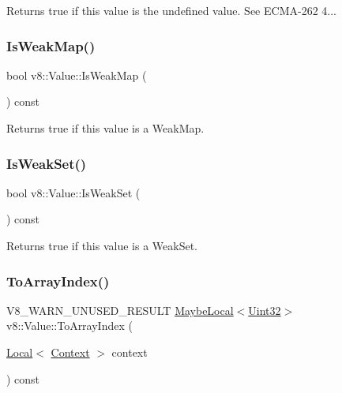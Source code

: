 Returns true if this value is the undefined value. See E\+C\+M\+A-\/262 4... \mbox{\label{classv8_1_1Value_a3be1c8f103d9aa9b31b3b1c56905337d}} 
\subsubsection{\texorpdfstring{Is\+Weak\+Map()}{IsWeakMap()}}
{\footnotesize\ttfamily bool v8\+::\+Value\+::\+Is\+Weak\+Map (\begin{DoxyParamCaption}{ }\end{DoxyParamCaption}) const}

Returns true if this value is a Weak\+Map. \mbox{\label{classv8_1_1Value_a66c2dbb0ed13325f0f9e6b38e5e1992c}} 
\subsubsection{\texorpdfstring{Is\+Weak\+Set()}{IsWeakSet()}}
{\footnotesize\ttfamily bool v8\+::\+Value\+::\+Is\+Weak\+Set (\begin{DoxyParamCaption}{ }\end{DoxyParamCaption}) const}

Returns true if this value is a Weak\+Set. \mbox{\label{classv8_1_1Value_a3d7597e5cf475e73f127e2591d46bdf4}} 
\subsubsection{\texorpdfstring{To\+Array\+Index()}{ToArrayIndex()}}
{\footnotesize\ttfamily V8\+\_\+\+W\+A\+R\+N\+\_\+\+U\+N\+U\+S\+E\+D\+\_\+\+R\+E\+S\+U\+LT \mbox{\hyperlink{classv8_1_1MaybeLocal}{Maybe\+Local}}$<$\mbox{\hyperlink{classv8_1_1Uint32}{Uint32}}$>$ v8\+::\+Value\+::\+To\+Array\+Index (\begin{DoxyParamCaption}\item[{\mbox{\hyperlink{classv8_1_1Local}{Local}}$<$ \mbox{\hyperlink{classv8_1_1Context}{Context}} $>$}]{context }\end{DoxyParamCaption}) const}

